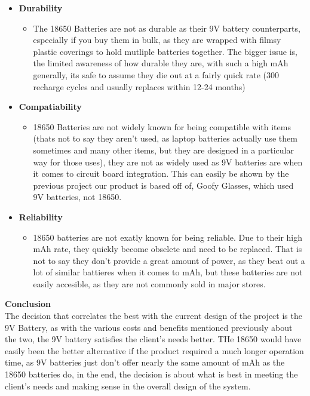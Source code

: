 \documentclass[12pt]{article}
\begin{document}
{{{{{{{\begin{itemize}
\begin{itemize}
				\end{itemize}
				\item \textbf{Durability}
				\begin{itemize}
					\item The 18650 Batteries are not as durable as their 9V battery counterparts, especially if you buy them in bulk, as they are wrapped with filmsy plastic coverings to hold mutliple batteries together. The bigger issue is, the limited awareness of how durable they are, with such a high mAh generally, its safe to assume they die out at a fairly quick rate (300 recharge cycles and usually replaces within 12-24 months)
				\end{itemize}
				\item \textbf{Compatiability}
				\begin{itemize}
					\item 18650 Batteries are not widely known for being compatible with items (thats not to say they aren't used, as laptop batteries actually use them sometimes and many other items, but they are designed in a particular way for those uses), they are not as widely used as 9V batteries are when it comes to circuit board integration. This can easily be shown by the previous project our product is based off of, Goofy Glasses, which used 9V batteries, not 18650.
				\end{itemize}
				\item \textbf{Reliability}
				\begin{itemize}
					\item 18650 batteries are not exatly known for being reliable. Due to their high mAh rate, they quickly become obselete and need to be replaced. That is not to say they don't provide a great amount of power, as they beat out a lot of similar battieres when it comes to mAh, but these batteries are not easily accesible, as they are not commonly sold in major stores.
				\end{itemize}
			\end{itemize}
	
			\noindent\textbf{Conclusion}\\
			\indent The decision that correlates the best with the current design of the project is the 9V Battery, as with the various costs and benefits mentioned previously about the two, the 9V battery satisfies the client's needs better. THe 18650 would have easily been the better alternative if the product required a much longer operation time, as 9V batteries just don't offer nearly the same amount of mAh as the 18650 batteries do, in the end, the decision is about what is best in meeting the client's needs and making sense in the overall design of the system.
			
}}}}}}}
\end{document}
